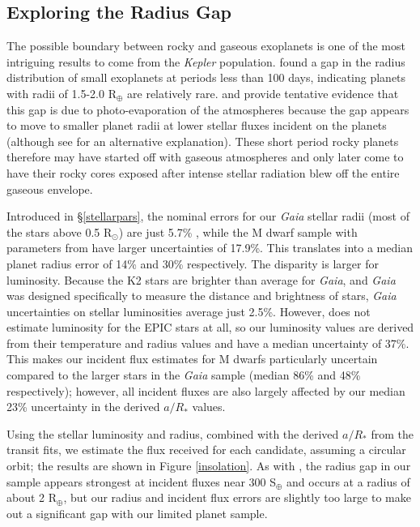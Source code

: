 \documentclass[twocolumn]{aastex62}
\newcommand{\project}[1]{\textsl{#1}}
\newcommand{\rserrgaia}{5.7}
\newcommand{\rserrhuber}{17.9}
\newcommand{\rperrgaia}{14}
\newcommand{\rperrhuber}{30}
\newcommand{\lumerrgaia}{2.5}
\newcommand{\lumerrhuber}{37}
\newcommand{\inserrgaia}{48}
\newcommand{\inserrhuber}{86}
\newcommand{\arerr}{23}
\begin{document}
\subsection{Exploring the Radius Gap} \label{sec:radius_gap}

The possible boundary between rocky and gaseous exoplanets is one of
the most intriguing results to come from the \project{Kepler}
population. \cite{ful17} found a gap in the radius distribution of
small exoplanets at periods less than 100 days, indicating planets
with radii of 1.5-2.0 R$_\oplus$ are relatively rare. \cite{lop16} and
\cite{van18b} provide tentative evidence that this gap is due to
photo-evaporation of the atmospheres because the gap appears to move
to smaller planet radii at lower stellar fluxes incident on the
planets (although see \cite{gup18} for an alternative
explanation). These short period rocky planets therefore may have
started off with gaseous atmospheres and only later come to have their
rocky cores exposed after intense stellar radiation blew off the
entire gaseous envelope.

Introduced in \S\ref{stellarpars}, the nominal errors for our
\project{Gaia} stellar radii (most of the stars above 0.5 R$_\odot$)
are just \rserrgaia{}\% \citep[better than the 11\% of ][]{ful17},
while the M dwarf sample with parameters from \cite{hub16} have larger
uncertainties of \rserrhuber{}\%. This translates into a median planet
radius error of \rperrgaia{}\% and \rperrhuber{}\% respectively. The
disparity is larger for luminosity. Because the K2 stars are brighter
than average for \project{Gaia}, and \project{Gaia} was designed
specifically to measure the distance and brightness of stars,
\project{Gaia} uncertainties on stellar luminosities average just
\lumerrgaia{}\%. However, \cite{hub16} does not estimate luminosity
for the EPIC stars at all, so our luminosity values are derived from
their temperature and radius values and have a median uncertainty of
\lumerrhuber{}\%. This makes our incident flux estimates for M dwarfs
particularly uncertain compared to the larger stars in the
\project{Gaia} sample (median \inserrhuber{}\% and \inserrgaia{}\%
respectively); however, all incident fluxes are also largely affected
by our median \arerr{}\% uncertainty in the derived $a/R_*$ values.

Using the stellar luminosity and radius, combined with the derived
$a/R_*$ from the transit fits, we estimate the flux received for each
candidate, assuming a circular orbit; the results are shown in Figure
\ref{insolation}. As with \cite{ful17}, the radius gap in our sample
appears strongest at incident fluxes near 300 S$_\oplus$ and occurs at
a radius of about 2 R$_\oplus$, but our radius and incident flux
errors are slightly too large to make out a significant gap with our
limited planet sample.
\end{document}
